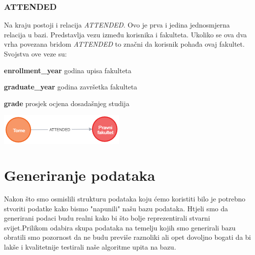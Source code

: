 \documentclass[titlepage, 12pt]{scrartcl}
\begin{document}
\subsubsection{ATTENDED}
Na kraju postoji i relacija \emph{ATTENDED}. Ovo je prva i jedina jednosmjerna relacija u bazi. Predstavlja vezu između korisnika i fakulteta. Ukoliko se ova dva vrha povezana bridom \emph{ATTENDED} to značni da korisnik pohađa ovaj fakultet. \\
Svojstva ove veze su:
\begin{itemize}
\begin{samepage}
    \item \textbf{enrollment\_year} godina upisa fakulteta
    \item \textbf{graduate\_year} godina završetka fakulteta
    \item \textbf{grade} prosjek ocjena dosadašnjeg studija
\end{samepage}
\end{itemize}
\begin{center}
    \includegraphics{slike/ATTENDED.png}    
\end{center}

\newpage

\section{Generiranje podataka}
Nakon što smo osmislili strukturu podataka koju ćemo koristiti bilo je potrebno stvoriti podatke kako bismo "napunili" našu bazu podataka. Htjeli smo da generirani podaci budu realni kako bi što bolje reprezentirali stvarni svijet.Prilikom odabira skupa podataka na temelju kojih smo generirali bazu obratili smo pozornost da ne budu previše raznoliki ali opet dovoljno bogati da bi lakše i kvalitetnije testirali naše algoritme upita na bazu.
\end{document}
